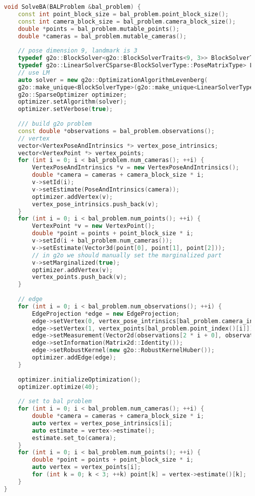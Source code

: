 \begin{lstlisting}[language=c++,caption=slambook2/ch9/bundle_adjustment_g2o.cpp (part)]
void SolveBA(BALProblem &bal_problem) {
	const int point_block_size = bal_problem.point_block_size();
	const int camera_block_size = bal_problem.camera_block_size();
	double *points = bal_problem.mutable_points();
	double *cameras = bal_problem.mutable_cameras();
	
	// pose dimension 9, landmark is 3
	typedef g2o::BlockSolver<g2o::BlockSolverTraits<9, 3>> BlockSolverType;
	typedef g2o::LinearSolverCSparse<BlockSolverType::PoseMatrixType> LinearSolverType;
	// use LM
	auto solver = new g2o::OptimizationAlgorithmLevenberg(
	g2o::make_unique<BlockSolverType>(g2o::make_unique<LinearSolverType>()));
	g2o::SparseOptimizer optimizer;
	optimizer.setAlgorithm(solver);
	optimizer.setVerbose(true);
	
	/// build g2o problem
	const double *observations = bal_problem.observations();
	// vertex
	vector<VertexPoseAndIntrinsics *> vertex_pose_intrinsics;
	vector<VertexPoint *> vertex_points;
	for (int i = 0; i < bal_problem.num_cameras(); ++i) {
		VertexPoseAndIntrinsics *v = new VertexPoseAndIntrinsics();
		double *camera = cameras + camera_block_size * i;
		v->setId(i);
		v->setEstimate(PoseAndIntrinsics(camera));
		optimizer.addVertex(v);
		vertex_pose_intrinsics.push_back(v);
	}
	for (int i = 0; i < bal_problem.num_points(); ++i) {
		VertexPoint *v = new VertexPoint();
		double *point = points + point_block_size * i;
		v->setId(i + bal_problem.num_cameras());
		v->setEstimate(Vector3d(point[0], point[1], point[2]));
		// in g2o we should manually set the marginalized part 
		v->setMarginalized(true);
		optimizer.addVertex(v);
		vertex_points.push_back(v);
	}
	
	// edge
	for (int i = 0; i < bal_problem.num_observations(); ++i) {
		EdgeProjection *edge = new EdgeProjection;
		edge->setVertex(0, vertex_pose_intrinsics[bal_problem.camera_index()[i]]);
		edge->setVertex(1, vertex_points[bal_problem.point_index()[i]]);
		edge->setMeasurement(Vector2d(observations[2 * i + 0], observations[2 * i + 1]));
		edge->setInformation(Matrix2d::Identity());
		edge->setRobustKernel(new g2o::RobustKernelHuber());
		optimizer.addEdge(edge);
	}
	
	optimizer.initializeOptimization();
	optimizer.optimize(40);
	
	// set to bal problem
	for (int i = 0; i < bal_problem.num_cameras(); ++i) {
		double *camera = cameras + camera_block_size * i;
		auto vertex = vertex_pose_intrinsics[i];
		auto estimate = vertex->estimate();
		estimate.set_to(camera);
	}
	for (int i = 0; i < bal_problem.num_points(); ++i) {
		double *point = points + point_block_size * i;
		auto vertex = vertex_points[i];
		for (int k = 0; k < 3; ++k) point[k] = vertex->estimate()[k];
	}
}
\end{lstlisting}

